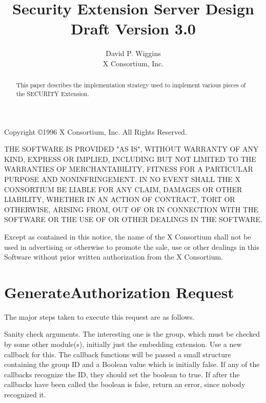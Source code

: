 \setlength{\parindent}{0 pt}
\setlength{\parskip}{6pt}



\title{Security Extension Server Design\\Draft Version 3.0}
\author{David P. Wiggins\\X Consortium, Inc.}
\maketitle

\begin{abstract}
This paper describes the implementation strategy used to implement
various pieces of the SECURITY Extension.
\end{abstract}
\thispagestyle{empty}

\eject

Copyright \copyright 1996 X Consortium, Inc.  All Rights Reserved.

THE SOFTWARE IS PROVIDED "AS IS", WITHOUT WARRANTY OF ANY KIND,
EXPRESS OR IMPLIED, INCLUDING BUT NOT LIMITED TO THE WARRANTIES OF
MERCHANTABILITY, FITNESS FOR A PARTICULAR PURPOSE AND NONINFRINGEMENT.
IN NO EVENT SHALL THE X CONSORTIUM BE LIABLE FOR ANY CLAIM, DAMAGES OR
OTHER LIABILITY, WHETHER IN AN ACTION OF CONTRACT, TORT OR OTHERWISE,
ARISING FROM, OUT OF OR IN CONNECTION WITH THE SOFTWARE OR THE USE OF
OR OTHER DEALINGS IN THE SOFTWARE.

Except as contained in this notice, the name of the X Consortium shall
not be used in advertising or otherwise to promote the sale, use or
other dealings in this Software without prior written authorization
from the X Consortium.

\eject

\section{GenerateAuthorization Request}

The major steps taken to execute this request are as follows.

Sanity check arguments.  The interesting one is the group, which must
be checked by some other module(s), initially just the embedding
extension.  Use a new callback for this.  The callback functions will
be passed a small structure containing the group ID and a Boolean
value which is initially false.  If any of the callbacks recognize the
ID, they should set the boolean to true.  If after the callbacks have
been called the boolean is false, return an error, since nobody
recognized it.


